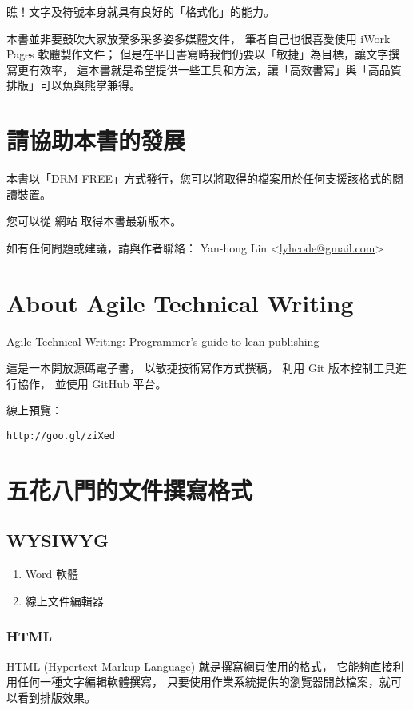 \documentclass[a4paper,12pt,english]{sphinxmanual}
\begin{document}
瞧！文字及符號本身就具有良好的「格式化」的能力。

本書並非要鼓吹大家放棄多采多姿多媒體文件，
筆者自己也很喜愛使用 iWork Pages 軟體製作文件；
但是在平日書寫時我們仍要以「敏捷」為目標，讓文字撰寫更有效率，
這本書就是希望提供一些工具和方法，讓「高效書寫」與「高品質排版」可以魚與熊掌兼得。


\chapter{請協助本書的發展}
\label{copyright::doc}\label{copyright:id1}
本書以「DRM FREE」方式發行，您可以將取得的檔案用於任何支援該格式的閱讀裝置。

您可以從 網站 取得本書最新版本。

如有任何問題或建議，請與作者聯絡： Yan-hong Lin \textless{}\href{mailto:lyhcode@gmail.com}{lyhcode@gmail.com}\textgreater{}


\chapter{About Agile Technical Writing}
\label{README:about-agile-technical-writing}\label{README::doc}
Agile Technical Writing: Programmer's guide to lean publishing

這是一本開放源碼電子書，
以敏捷技術寫作方式撰稿，
利用 Git 版本控制工具進行協作，
並使用 GitHub 平台。

線上預覽：

\begin{Verbatim}[commandchars=@\[\]]
http://goo.gl/ziXed
\end{Verbatim}


\chapter{五花八門的文件撰寫格式}
\label{syntax::doc}\label{syntax:id1}

\section{WYSIWYG}
\label{syntax:wysiwyg}\begin{enumerate}
\item {} 
Word 軟體

\item {} 
線上文件編輯器

\end{enumerate}


\subsection{HTML}
\label{syntax:html}
HTML (Hypertext Markup Language) 就是撰寫網頁使用的格式，
它能夠直接利用任何一種文字編輯軟體撰寫，
只要使用作業系統提供的瀏覽器開啟檔案，就可以看到排版效果。
\end{document}
